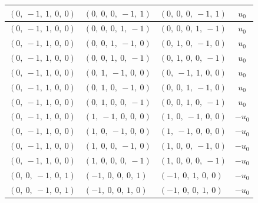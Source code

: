 \documentclass[11pt]{article}
\theoremstyle{definition}
\begin{document}
\begin{longtable}{|l|l|l|c|}
    \hline
    $\left( 0, \  -1, \  1, \  0, \  0\right)$ & $\left( 0, \  0, \  0, \  -1, \  1\right)$ & $\left( 0, \  0, \  0, \  -1, \  1\right)$ & $u_{0}$ \\
    \hline
    $\left( 0, \  -1, \  1, \  0, \  0\right)$ & $\left( 0, \  0, \  0, \  1, \  -1\right)$ & $\left( 0, \  0, \  0, \  1, \  -1\right)$ & $u_{0}$ \\
    \hline
    $\left( 0, \  -1, \  1, \  0, \  0\right)$ & $\left( 0, \  0, \  1, \  -1, \  0\right)$ & $\left( 0, \  1, \  0, \  -1, \  0\right)$ & $u_{0}$ \\
    \hline
    $\left( 0, \  -1, \  1, \  0, \  0\right)$ & $\left( 0, \  0, \  1, \  0, \  -1\right)$ & $\left( 0, \  1, \  0, \  0, \  -1\right)$ & $u_{0}$ \\
    \hline
    $\left( 0, \  -1, \  1, \  0, \  0\right)$ & $\left( 0, \  1, \  -1, \  0, \  0\right)$ & $\left( 0, \  -1, \  1, \  0, \  0\right)$ & $u_{0}$ \\
    \hline
    $\left( 0, \  -1, \  1, \  0, \  0\right)$ & $\left( 0, \  1, \  0, \  -1, \  0\right)$ & $\left( 0, \  0, \  1, \  -1, \  0\right)$ & $u_{0}$ \\
    \hline
    $\left( 0, \  -1, \  1, \  0, \  0\right)$ & $\left( 0, \  1, \  0, \  0, \  -1\right)$ & $\left( 0, \  0, \  1, \  0, \  -1\right)$ & $u_{0}$ \\
    \hline
    $\left( 0, \  -1, \  1, \  0, \  0\right)$ & $\left( 1, \  -1, \  0, \  0, \  0\right)$ & $\left( 1, \  0, \  -1, \  0, \  0\right)$ & $- u_{0}$ \\
    \hline
    $\left( 0, \  -1, \  1, \  0, \  0\right)$ & $\left( 1, \  0, \  -1, \  0, \  0\right)$ & $\left( 1, \  -1, \  0, \  0, \  0\right)$ & $- u_{0}$ \\
    \hline
    $\left( 0, \  -1, \  1, \  0, \  0\right)$ & $\left( 1, \  0, \  0, \  -1, \  0\right)$ & $\left( 1, \  0, \  0, \  -1, \  0\right)$ & $- u_{0}$ \\
    \hline
    $\left( 0, \  -1, \  1, \  0, \  0\right)$ & $\left( 1, \  0, \  0, \  0, \  -1\right)$ & $\left( 1, \  0, \  0, \  0, \  -1\right)$ & $- u_{0}$ \\
    \hline
    $\left( 0, \  0, \  -1, \  0, \  1\right)$ & $\left( -1, \  0, \  0, \  0, \  1\right)$ & $\left( -1, \  0, \  1, \  0, \  0\right)$ & $- u_{0}$ \\
    \hline
    $\left( 0, \  0, \  -1, \  0, \  1\right)$ & $\left( -1, \  0, \  0, \  1, \  0\right)$ & $\left( -1, \  0, \  0, \  1, \  0\right)$ & $- u_{0}$ \\

\end{longtable}
\end{document}

